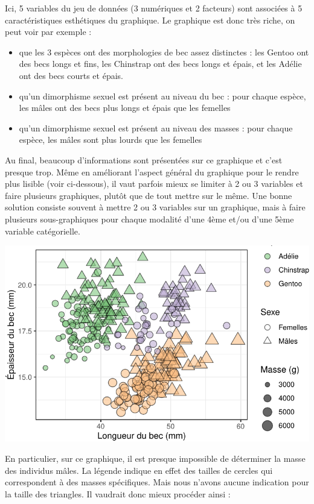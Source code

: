 \documentclass[
  a4paper,
  DIV=11,
  numbers=noendperiod,
  oneside]{scrreprt}
\providecommand{\tightlist}{%
  \setlength{\itemsep}{0pt}\setlength{\parskip}{0pt}}\usepackage{longtable,booktabs,array}
\begin{document}
Ici, 5 variables du jeu de données (3 numériques et 2 facteurs) sont
associées à 5 caractéristiques esthétiques du graphique. Le graphique
est donc très riche, on peut voir par exemple :

\begin{itemize}
\tightlist
\item
  que les 3 espèces ont des morphologies de bec assez distinctes : les
  Gentoo ont des becs longs et fins, les Chinstrap ont des becs longs et
  épais, et les Adélie ont des becs courts et épais.
\item
  qu'un dimorphisme sexuel est présent au niveau du bec : pour chaque
  espèce, les mâles ont des becs plus longs et épais que les femelles
\item
  qu'un dimorphisme sexuel est présent au niveau des masses : pour
  chaque espèce, les mâles sont plus lourds que les femelles
\end{itemize}

Au final, beaucoup d'informations sont présentées sur ce graphique et
c'est presque trop. Même en améliorant l'aspect général du graphique
pour le rendre plus lisible (voir ci-dessous), il vaut parfois mieux se
limiter à 2 ou 3 variables et faire plusieurs graphiques, plutôt que de
tout mettre sur le même. Une bonne solution consiste souvent à mettre 2
ou 3 variables sur un graphique, mais à faire plusieurs sous-graphiques
pour chaque modalité d'une 4ème et/ou d'une 5ème variable catégorielle.

\includegraphics{03-visualization_files/figure-pdf/unnamed-chunk-79-1.pdf}

En particulier, sur ce graphique, il est presque impossible de
déterminer la masse des individus mâles. La légende indique en effet des
tailles de cercles qui correspondent à des masses spécifiques. Mais nous
n'avons aucune indication pour la taille des triangles. Il vaudrait donc
mieux procéder ainsi :
\end{document}
